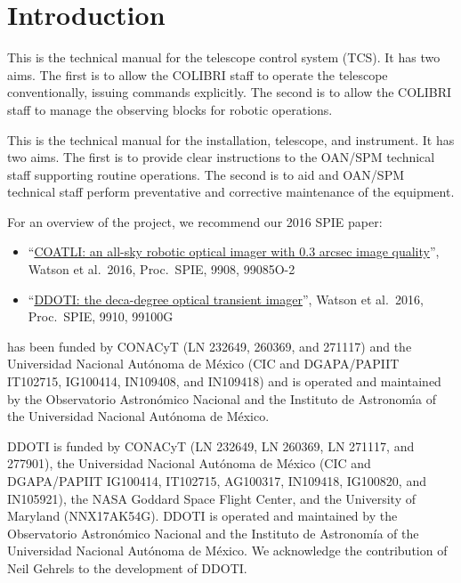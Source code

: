 \chapter{Introduction}
\label{chapter:introduction}

\ifcolibri

This is the technical manual for the {\projectname} telescope control system (TCS). It has two aims. The first is to allow the COLIBRI staff to operate the telescope conventionally, issuing commands explicitly. The second is to allow the COLIBRI staff to manage the observing blocks for robotic operations.

\else

This is the technical manual for the {\projectname} installation, telescope, and instrument. It has two aims. The first is to provide clear instructions to the OAN/SPM technical staff supporting routine operations. The second is to aid {\projectname} and OAN/SPM technical staff perform preventative and corrective maintenance of the equipment.

For an overview of the {\projectname} project, we recommend our 2016 SPIE paper:

\ifcoatli
\begin{itemize}
\item “\href{bibliography/spie-coatli-2016.pdf}{COATLI: an all-sky robotic optical imager with 0.3 arcsec image quality}”,   Watson et al.\ 2016, Proc.\ SPIE, 9908, 99085O-2
\end{itemize}
\fi

\ifddoti
\begin{itemize}
\item “\href{bibliography/spie-ddoti-2016.pdf}{DDOTI: the deca-degree optical transient imager}”, Watson et al.\ 2016, Proc.\ SPIE, 9910, 99100G
\end{itemize}
\fi

\ifcoatli
{\projectname} has been funded by CONACyT (LN 232649, 260369, and 271117)
and the Universidad Nacional Aut\'onoma de M\'exico (CIC and
DGAPA/PAPIIT IT102715, IG100414, IN109408, and IN109418) and is operated and
maintained by the Observatorio Astron\'omico Nacional and the Instituto
de Astronom{\'\i}a of the Universidad Nacional Aut\'onoma de M\'exico.
\fi

\ifddoti
DDOTI is funded by CONACyT (LN 232649, LN 260369, LN 271117, and 277901), the Universidad Nacional Autónoma de México (CIC and DGAPA/PAPIIT IG100414, IT102715, AG100317, IN109418, IG100820, and IN105921), the NASA Goddard Space Flight Center, and the University of Maryland (NNX17AK54G). DDOTI is operated and maintained by the Observatorio Astronómico Nacional and the Instituto de Astronomía of the Universidad Nacional Autónoma de México. We acknowledge the contribution of Neil Gehrels to the development of DDOTI.
\fi

\fi